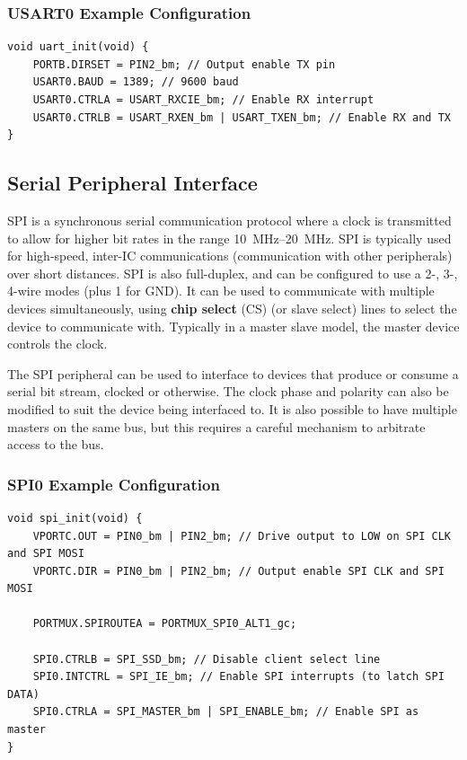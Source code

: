 \documentclass{report}
\begin{document}
\subsubsection{USART0 Example Configuration}
\begin{verbatim}
void uart_init(void) {
    PORTB.DIRSET = PIN2_bm; // Output enable TX pin
    USART0.BAUD = 1389; // 9600 baud
    USART0.CTRLA = USART_RXCIE_bm; // Enable RX interrupt
    USART0.CTRLB = USART_RXEN_bm | USART_TXEN_bm; // Enable RX and TX
}
\end{verbatim}
\subsection{Serial Peripheral Interface}
SPI is a synchronous serial communication protocol where a clock is transmitted
to allow for higher bit rates in the range \qtyrange{10}{20}{MHz}. SPI is typically
used for high-speed, inter-IC communications (communication with other peripherals) over short distances.
SPI is also \linebreak full-duplex, and can be configured to use a 2-, 3-, 4-wire modes (plus 1 for GND).
It can be used to communicate with multiple devices simultaneously, using
\textbf{chip select} (CS) (or slave select) lines to select the device to communicate with.
Typically in a master slave model, the master device controls the clock.

The SPI peripheral can be used to interface to devices that produce or consume a serial bit stream, clocked or otherwise.
The clock phase and polarity can also be modified to suit the device being interfaced to. It is also possible to have multiple
masters on the same bus, but this requires a careful mechanism to arbitrate access to the bus.
\subsubsection{SPI0 Example Configuration}
\begin{verbatim}
void spi_init(void) {
    VPORTC.OUT = PIN0_bm | PIN2_bm; // Drive output to LOW on SPI CLK and SPI MOSI
    VPORTC.DIR = PIN0_bm | PIN2_bm; // Output enable SPI CLK and SPI MOSI

    PORTMUX.SPIROUTEA = PORTMUX_SPI0_ALT1_gc;

    SPI0.CTRLB = SPI_SSD_bm; // Disable client select line
    SPI0.INTCTRL = SPI_IE_bm; // Enable SPI interrupts (to latch SPI DATA)
    SPI0.CTRLA = SPI_MASTER_bm | SPI_ENABLE_bm; // Enable SPI as master
}
\end{verbatim}
\end{document}
